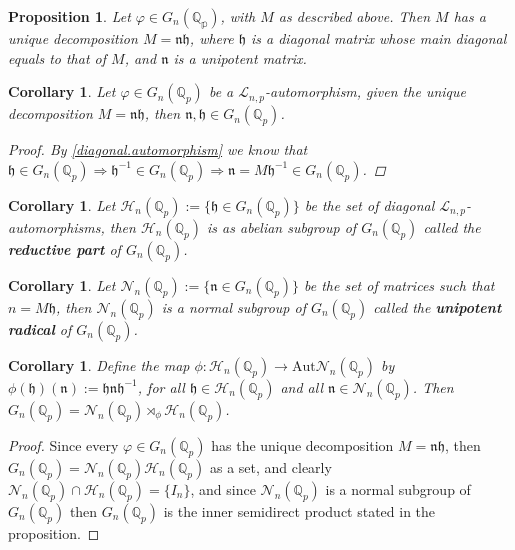 \documentclass[12pt]{article}
\newtheorem{proposition}[theorem]{Proposition}
\newtheorem{corollary}[theorem]{Corollary}
\begin{document}
\begin{proposition}
Let $\varphi\in{G_{n}(\mathbb{\mathbb{Q}_p})}$, with $M$ as described above. Then $M$ has a unique decomposition $M=\mathfrak{n}\mathfrak{h}$, where $\mathfrak{h}$ is a diagonal matrix whose main diagonal equals to that of $M$, and $\mathfrak{n}$ is a unipotent matrix.
\end{proposition}
\begin{corollary}
Let $\varphi\in{G_n(\mathbb{Q}_p)}$ be a $\mathcal{L}_{n,p}$-automorphism, given the unique decomposition $M=\mathfrak{n}\mathfrak{h}$, then $\mathfrak{n},\mathfrak{h}\in{G_{n}}(\mathbb{Q}_p)$.
\begin{proof}
By \ref{diagonal.automorphism} we know that $\mathfrak{h}\in{G_{n}(\mathbb{Q}_p)}\Rightarrow\mathfrak{h}^{-1}\in{G_{n}(\mathbb{Q}_p)}\Rightarrow\mathfrak{n}=M\mathfrak{h}^{-1}\in{G_{n}(\mathbb{Q}_p)}$.
\end{proof}
\end{corollary}
\begin{corollary}
Let $\mathcal{H}_{n}(\mathbb{Q}_p):=\{\mathfrak{h}\in{G_{n}(\mathbb{Q}_p)}\}$ be the set of diagonal $\mathcal{L}_{n,p}$-automorphisms, then $\mathcal{H}_{n}(\mathbb{Q}_p)$ is as abelian subgroup of $G_{n}(\mathbb{Q}_p)$ called the \textbf{reductive part} of $G_{n}(\mathbb{Q}_p)$.
\end{corollary}
\begin{corollary}
Let $\mathcal{N}_{n}(\mathbb{Q}_p):=\{\mathfrak{n}\in{G_{n}(\mathbb{Q}_p)}\}$ be the set of matrices such that $n=M\mathfrak{h}$, then $\mathcal{N}_{n}(\mathbb{Q}_p)$ is a normal subgroup of $G_{n}(\mathbb{Q}_p)$ called the \textbf{unipotent radical} of $G_{n}(\mathbb{Q}_p)$.
\end{corollary}
\begin{corollary}
Define the map $\phi:\mathcal{H}_{n}(\mathbb{Q}_p)\rightarrow\mathrm{Aut}{\mathcal{N}_{n}}(\mathbb{Q}_p)$ by $\phi(\mathfrak{h})(\mathfrak{n}):=\mathfrak{h}\mathfrak{n}\mathfrak{h}^{-1}$, for all $\mathfrak{h}\in\mathcal{H}_{n}(\mathbb{Q}_p)$ and all $\mathfrak{n}\in\mathcal{N}_{n}(\mathbb{Q}_p)$. Then $G_{n}(\mathbb{Q}_p)=\mathcal{N}_{n}(\mathbb{Q}_p)\rtimes_{\phi}\mathcal{H}_{n}(\mathbb{Q}_p)$.
\end{corollary}
\begin{proof}
Since every $\varphi\in{G_{n}(\mathbb{Q}_p)}$ has the unique decomposition $M=\mathfrak{n}\mathfrak{h}$, then $G_{n}(\mathbb{Q}_p)=\mathcal{N}_{n}(\mathbb{Q}_p)\mathcal{H}_{n}(\mathbb{Q}_p)$ as a set, and clearly $\mathcal{N}_{n}(\mathbb{Q}_p)\cap\mathcal{H}_{n}(\mathbb{Q}_p)=\{I_{n}\}$, and since $\mathcal{N}_{n}(\mathbb{Q}_p)$ is a normal subgroup of $G_{n}(\mathbb{Q}_p)$ then $G_{n}(\mathbb{Q}_p)$ is the inner semidirect product stated in the proposition.  
\end{proof}
\end{document}
